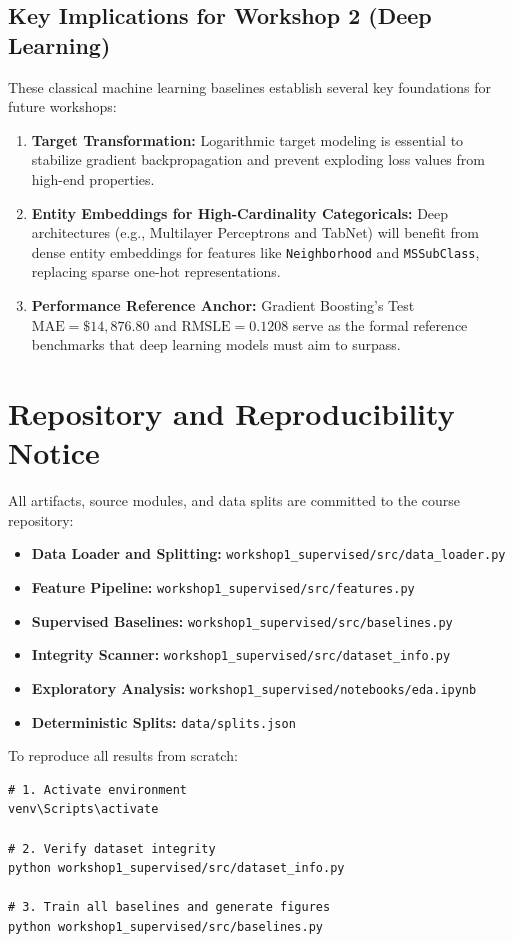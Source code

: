 \documentclass[11pt,a4paper]{article}
\begin{document}
\subsection{Key Implications for Workshop 2 (Deep Learning)}
These classical machine learning baselines establish several key foundations for future workshops:
\begin{enumerate}
    \item \textbf{Target Transformation:} Logarithmic target modeling is essential to stabilize gradient backpropagation and prevent exploding loss values from high-end properties.
    \item \textbf{Entity Embeddings for High-Cardinality Categoricals:} Deep architectures (e.g., Multilayer Perceptrons and TabNet) will benefit from dense entity embeddings for features like \texttt{Neighborhood} and \texttt{MSSubClass}, replacing sparse one-hot representations.
    \item \textbf{Performance Reference Anchor:} Gradient Boosting's Test $\text{MAE} = \$14,876.80$ and $\text{RMSLE} = 0.1208$ serve as the formal reference benchmarks that deep learning models must aim to surpass.
\end{enumerate}

\section*{Repository and Reproducibility Notice}
All artifacts, source modules, and data splits are committed to the course repository:
\begin{itemize}
    \item \textbf{Data Loader and Splitting:} \texttt{workshop1\_supervised/src/data\_loader.py}
    \item \textbf{Feature Pipeline:} \texttt{workshop1\_supervised/src/features.py}
    \item \textbf{Supervised Baselines:} \texttt{workshop1\_supervised/src/baselines.py}
    \item \textbf{Integrity Scanner:} \texttt{workshop1\_supervised/src/dataset\_info.py}
    \item \textbf{Exploratory Analysis:} \texttt{workshop1\_supervised/notebooks/eda.ipynb}
    \item \textbf{Deterministic Splits:} \texttt{data/splits.json}
\end{itemize}

To reproduce all results from scratch:
\begin{verbatim}
# 1. Activate environment
venv\Scripts\activate

# 2. Verify dataset integrity
python workshop1_supervised/src/dataset_info.py

# 3. Train all baselines and generate figures
python workshop1_supervised/src/baselines.py
\end{verbatim}
\end{document}
